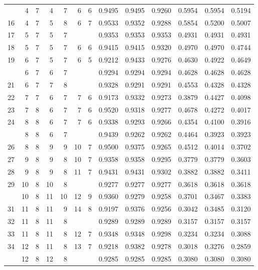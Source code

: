 \begin{Schunk}
\begin{longtable}{rrrrrrrrrrrrr}
\addlinespace
15 & 4 & 7 & 4 & 7 & 6 & 6 & 0.9495 & 0.9495 & 0.9260 & 0.5954 & 0.5954 & 0.5194\\
16 & 4 & 7 & 5 & 8 & 6 & 7 & 0.9533 & 0.9352 & 0.9288 & 0.5854 & 0.5200 & 0.5007\\
17 & 5 & 7 & 5 & 7 &  &  & 0.9353 & 0.9353 & 0.9353 & 0.4931 & 0.4931 & 0.4931\\
18 & 5 & 7 & 5 & 7 & 6 & 6 & 0.9415 & 0.9415 & 0.9320 & 0.4970 & 0.4970 & 0.4744\\
19 & 6 & 7 & 5 & 7 & 6 & 5 & 0.9212 & 0.9433 & 0.9276 & 0.4630 & 0.4922 & 0.4649\\
\addlinespace
20 & 6 & 7 & 6 & 7 &  &  & 0.9294 & 0.9294 & 0.9294 & 0.4628 & 0.4628 & 0.4628\\
21 & 6 & 7 & 7 & 8 &  &  & 0.9328 & 0.9291 & 0.9291 & 0.4553 & 0.4328 & 0.4328\\
22 & 7 & 7 & 6 & 7 & 7 & 6 & 0.9173 & 0.9332 & 0.9273 & 0.3879 & 0.4427 & 0.4098\\
23 & 7 & 8 & 6 & 7 & 7 & 6 & 0.9520 & 0.9318 & 0.9277 & 0.4678 & 0.4272 & 0.4017\\
24 & 8 & 8 & 6 & 7 & 7 & 6 & 0.9338 & 0.9293 & 0.9266 & 0.4354 & 0.4100 & 0.3916\\
\addlinespace
25 & 8 & 8 & 6 & 7 &  &  & 0.9439 & 0.9262 & 0.9262 & 0.4464 & 0.3923 & 0.3923\\
26 & 8 & 8 & 9 & 9 & 10 & 7 & 0.9500 & 0.9375 & 0.9265 & 0.4512 & 0.4014 & 0.3702\\
27 & 9 & 8 & 9 & 8 & 10 & 7 & 0.9358 & 0.9358 & 0.9295 & 0.3779 & 0.3779 & 0.3603\\
28 & 9 & 8 & 9 & 8 & 11 & 7 & 0.9431 & 0.9431 & 0.9302 & 0.3882 & 0.3882 & 0.3411\\
29 & 10 & 8 & 10 & 8 &  &  & 0.9277 & 0.9277 & 0.9277 & 0.3618 & 0.3618 & 0.3618\\
\addlinespace
30 & 10 & 8 & 11 & 10 & 12 & 9 & 0.9360 & 0.9279 & 0.9258 & 0.3701 & 0.3467 & 0.3383\\
31 & 11 & 8 & 11 & 9 & 14 & 8 & 0.9197 & 0.9376 & 0.9256 & 0.3042 & 0.3485 & 0.3120\\
32 & 11 & 8 & 11 & 8 &  &  & 0.9289 & 0.9289 & 0.9289 & 0.3157 & 0.3157 & 0.3157\\
33 & 11 & 8 & 11 & 8 & 12 & 7 & 0.9348 & 0.9348 & 0.9298 & 0.3234 & 0.3234 & 0.3088\\
34 & 12 & 8 & 11 & 8 & 13 & 7 & 0.9218 & 0.9382 & 0.9278 & 0.3018 & 0.3276 & 0.2859\\
\addlinespace
35 & 12 & 8 & 12 & 8 &  &  & 0.9285 & 0.9285 & 0.9285 & 0.3080 & 0.3080 & 0.3080\\

\end{longtable}
\end{Schunk}
